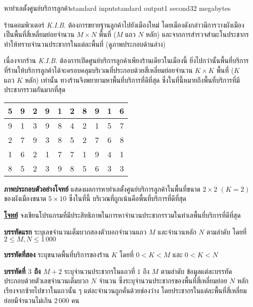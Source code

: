 \documentclass[11pt,a4paper]{article}
\begin{document}
\begin{problem}{หาทำเลตั้งศูนย์บริการลูกค้า}{standard input}{standard output}{1 second}{32 megabytes}

ร้านคอมพิวเตอร์ \textit{K.I.B.} ต้องการขยายฐานลูกค้าไปยังเมืองใหม่ โดยเมืองดังกล่าวมีการวางผังเมืองเป็นพื้นที่สี่เหลี่ยมย่อยจำนวน $M \times N$ พื้นที่ ($M$ แถว $N$ หลัก) และจากการสำรวจสำมะโนประชากรทำให้ทราบจำนวนประชากรในแต่ละพื้นที่ (ดูภาพประกอบด้านล่าง)

เนื่องจากร้าน \textit{K.I.B.} ต้องการเปิดศูนย์บริการลูกค้าเพียงร้านเดียวในเมืองนี้ ยิ่งไปกว่านั้นพื้นที่บริการที่ร้านให้บริการลูกค้าได้จะครอบคลุมบริเวณที่ประกอบด้วยสี่เหลี่ยมย่อยจำนวน $K \times K$ พื้นที่ ($K$ แถว $K$ หลัก) เท่านั้น ทางร้านจึงพยายามหาพื้นที่บริการที่ดีที่สุด ซึ่งในที่นี้หมายถึงพื้นที่บริการที่มีประชากรรวมกันมากที่สุด

\begin{center}
\begin{tabular}{|c|c|c|c|c|c|c|c|c|c|}
\hline
5 & 9 & 2 & 9 & 1 & 2 & 8 & 9 & 1 & 6\\
\hline
9 & 1 & 3 & 9 & 8 & 4 & 2 & 1 & 5 & 7\\
\hline
2 & 7 & 9 & 3 & 8 & 5 & 2 & 7 & 6 & 8\\
\hline
1 & 6 & 2 & 1 & \cellcolor{red!25}7 & \cellcolor{red!25}7 & 1 & 9 & 4 & 1\\
\hline
8 & 5 & 2 & 3 & \cellcolor{red!25}9 & \cellcolor{red!25}8 & 5 & 6 & 3 & 3\\
\hline
\end{tabular}

\textbf{ภาพประกอบตัวอย่างโจทย์} แสดงผลการหาทำเลตั้งศูนย์บริการลูกค้าในพื้นที่ขนาด $2\times 2$  $(K = 2)$\\ ของผังเมืองขนาด $5 \times 10$ ซึ่งในที่นี้ บริเวณที่ถูกเน้นคือพื้นที่บริการที่ดีที่สุด
\end{center}

\bigskip
\underline{\textbf{โจทย์}}  จงเขียนโปรแกรมที่มีประสิทธิภาพในการหาจำนวนประชากรรวมในทำเลพื้นที่บริการที่ดีที่สุด


\InputFile

\textbf{บรรทัดแรก} ระบุเลขจำนวนเต็มบวกสองตัวบอกจำนวนแถว $M$ และจำนวนหลัก $N$ ตามลำดับ โดยที่ $2 \leq M,N \leq 1\,000$

\textbf{บรรทัดที่สอง} ระบุขนาดพื้นที่บริการของร้าน $K$ โดยที่ $0 < K < M$ และ $0 < K < N$

\textbf{บรรทัดที่ $3$ ถึง $M+2$} ระบุจำนวนประชากรในแถวที่ $1$ ถึง $M$ ตามลำดับ ข้อมูลแต่ละบรรทัดประกอบด้วยตัวเลขจำนวนเต็มบวก $N$ จำนวน ซึ่งระบุจำนวนประชากรของพื้นที่สี่เหลี่ยมย่อย $N$ หลัก เรียงจากซ้ายไปขวาในแถวนั้น ๆ แต่ละจำนวนถูกคั่นด้วยช่องว่าง โดยประชากรในแต่ละพื้นที่สี่เหลี่ยมย่อยมีจำนวนไม่เกิน $2\,000$ คน



\end{problem}
\end{document}
